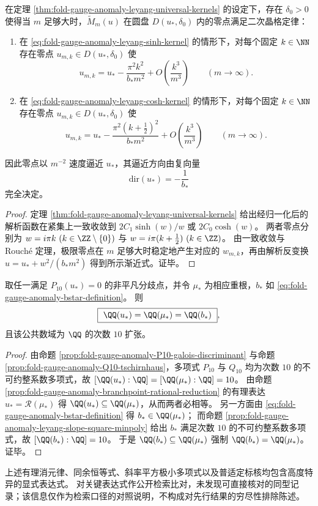 \begin{corollary}\label{cor:fold-gauge-anomaly-leyang-quadratic-lattice-zeros}
在定理 \ref{thm:fold-gauge-anomaly-leyang-universal-kernels} 的设定下，存在 \(\delta_0>0\) 使得当 \(m\) 足够大时，\(\widetilde M_m(u)\) 在圆盘 \(D(u_\ast,\delta_0)\) 内的零点满足二次晶格定律：
\begin{enumerate}
  \item 在 \eqref{eq:fold-gauge-anomaly-leyang-sinh-kernel} 的情形下，对每个固定 \(k\in\NN\) 存在零点 \(u_{m,k}\in D(u_\ast,\delta_0)\) 使
  \[
  u_{m,k}=u_\ast-\frac{\pi^2 k^2}{b_\ast m^2}+O\!\left(\frac{k^3}{m^3}\right)\qquad(m\to\infty).
  \]
  \item 在 \eqref{eq:fold-gauge-anomaly-leyang-cosh-kernel} 的情形下，对每个固定 \(k\in\NN\) 存在零点 \(u_{m,k}\in D(u_\ast,\delta_0)\) 使
  \[
  u_{m,k}=u_\ast-\frac{\pi^2 (k+\tfrac12)^2}{b_\ast m^2}+O\!\left(\frac{k^3}{m^3}\right)\qquad(m\to\infty).
  \]
\end{enumerate}
因此零点以 \(m^{-2}\) 速度逼近 \(u_\ast\)，其逼近方向由复向量
\[
\boxed{\ \mathrm{dir}(u_\ast)=-\frac{1}{b_\ast}\ }
\]
完全决定。
\end{corollary}
\begin{proof}
定理 \ref{thm:fold-gauge-anomaly-leyang-universal-kernels} 给出经归一化后的解析函数在紧集上一致收敛到
\(
2C_1\sinh(w)/w
\)
或
\(
2C_0\cosh(w)
\)。
两者零点分别为 \(w=i\pi k\ (k\in\ZZ\setminus\{0\})\) 与 \(w=i\pi(k+\tfrac12)\ (k\in\ZZ)\)。
由一致收敛与 Rouch\'e 定理，极限零点在 \(m\) 足够大时稳定地产生对应的 \(w_{m,k}\)，再由解析反变换 \(u=u_\ast+w^2/(b_\ast m^2)\) 得到所示渐近式。证毕。
\end{proof}

\begin{corollary}\label{cor:fold-gauge-anomaly-field-equality-u-mu-b}
取任一满足 \(P_{10}(u_\ast)=0\) 的非平凡分歧点，并令 \(\mu_\ast\) 为相应重根，\(b_\ast\) 如 \eqref{eq:fold-gauge-anomaly-bstar-definition}。
则
\[
\boxed{\ \QQ(u_\ast)=\QQ(\mu_\ast)=\QQ(b_\ast)\ } ,
\]
且该公共数域为 \(\QQ\) 的次数 \(10\) 扩张。
\end{corollary}
\begin{proof}
由命题 \ref{prop:fold-gauge-anomaly-P10-galois-discriminant} 与命题 \ref{prop:fold-gauge-anomaly-Q10-tschirnhaus}，多项式 \(P_{10}\) 与 \(Q_{10}\) 均为次数 \(10\) 的不可约整系数多项式，故 \([\QQ(u_\ast):\QQ]=[\QQ(\mu_\ast):\QQ]=10\)。
由命题 \ref{prop:fold-gauge-anomaly-branchpoint-rational-reduction} 的有理表达 \(u_\ast=\mathcal R(\mu_\ast)\) 得 \(\QQ(u_\ast)\subseteq \QQ(\mu_\ast)\)，从而两者必相等。
另一方面由 \eqref{eq:fold-gauge-anomaly-bstar-definition} 得 \(b_\ast\in\QQ(\mu_\ast)\)；
而命题 \ref{prop:fold-gauge-anomaly-leyang-slope-square-minpoly} 给出 \(b_\ast\) 满足次数 \(10\) 的不可约整系数多项式，故 \([\QQ(b_\ast):\QQ]=10\)。
于是 \(\QQ(b_\ast)\subseteq\QQ(\mu_\ast)\) 强制 \(\QQ(b_\ast)=\QQ(\mu_\ast)\)。证毕。
\end{proof}

\begin{remark}[可检索性核验说明]\label{rem:fold-gauge-anomaly-leyang-branchpoint-public-search-note}
上述有理消元律、同余恒等式、斜率平方极小多项式以及普适定标核均包含高度特异的显式表达式。
对关键表达式作公开检索比对，未发现可直接核对的同型记录；该信息仅作为检索口径的对照说明，不构成对先行结果的穷尽性排除陈述。
\end{remark}

\endinput
